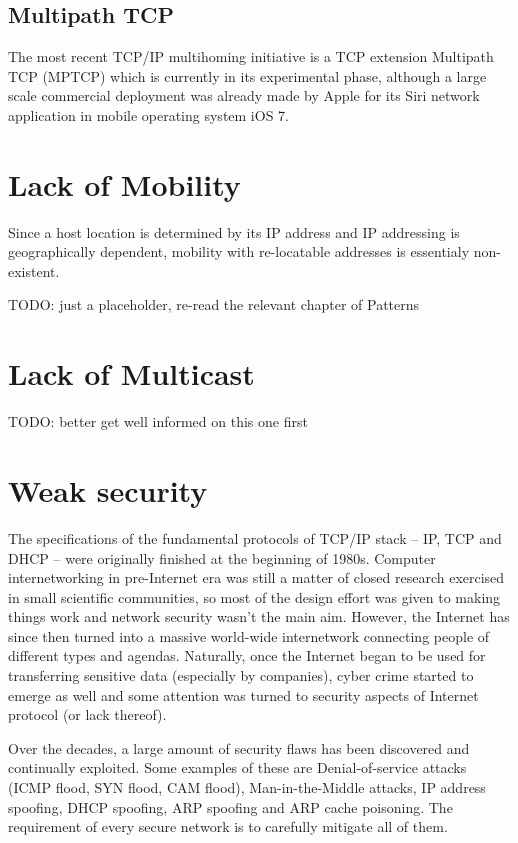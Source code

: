         \subsection{Multipath TCP}
        The most recent TCP/IP multihoming initiative is a TCP extension Multipath TCP (MPTCP) which is currently in its experimental phase, although a large scale commercial deployment was already made by Apple for its Siri network application in mobile operating system iOS 7.

    \section{Lack of Mobility}

        Since a host location is determined by its IP address and IP addressing is geographically dependent, mobility with re-locatable addresses is essentialy non-existent.

        TODO: just a placeholder, re-read the relevant chapter of Patterns

    \section{Lack of Multicast}

        TODO: better get well informed on this one first

    \section{Weak security}
        The specifications of the fundamental protocols of TCP/IP stack -- IP, TCP and DHCP -- were originally finished at the beginning of 1980s. Computer internetworking in pre-Internet era was still a matter of closed research exercised in small scientific communities, so most of the design effort was given to making things work and network security wasn't the main aim. However, the Internet has since then turned into a massive world-wide internetwork connecting people of different types and agendas. Naturally, once the Internet began to be used for transferring sensitive data (especially by companies), cyber crime started to emerge as well and some attention was turned to security aspects of Internet protocol (or lack thereof).

        Over the decades, a large amount of security flaws has been discovered and continually exploited. Some examples of these are Denial-of-service attacks (ICMP flood, SYN flood, CAM flood), Man-in-the-Middle attacks, IP address spoofing, DHCP spoofing, ARP spoofing and ARP cache poisoning. The requirement of every secure network is to carefully mitigate all of them.

